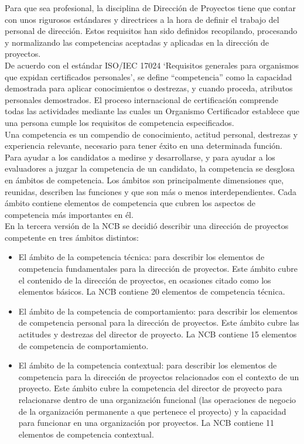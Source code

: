 Para que sea profesional, la disciplina de Dirección de Proyectos tiene que contar con unos rigurosos estándares y directrices a la hora de definir el trabajo del personal de dirección. Estos requisitos han sido definidos recopilando, procesando y normalizando las competencias aceptadas y aplicadas en la dirección de proyectos.\\

De acuerdo con el estándar ISO/IEC 17024 ‘Requisitos generales para organismos que expidan certificados personales', se define “competencia” como la capacidad demostrada para aplicar conocimientos o destrezas, y cuando proceda, atributos personales demostrados. El proceso internacional de certificación comprende todas las actividades mediante las cuales un Organismo Certificador establece que una persona cumple los requisitos de competencia especificados.\\

Una competencia es un compendio de conocimiento, actitud personal, destrezas y experiencia relevante, necesario para tener éxito en una determinada función. Para ayudar a los candidatos a medirse y desarrollarse, y para ayudar a los evaluadores a juzgar la competencia de un candidato, la competencia se desglosa en ámbitos de competencia. Los ámbitos son principalmente dimensiones que, reunidas, describen las funciones y que son más o menos interdependientes. Cada ámbito contiene elementos de competencia que cubren los aspectos de competencia más importantes en él.\\

En la tercera versión de la NCB se decidió describir una dirección de proyectos competente en tres ámbitos distintos:\\
\begin{itemize}
	\item El ámbito de la competencia técnica: para describir los elementos de competencia fundamentales para la dirección de proyectos. Este ámbito cubre el contenido de la dirección de proyectos, en ocasiones citado como los elementos básicos. La NCB contiene 20 elementos de competencia técnica.\\
	\item El ámbito de la competencia de comportamiento: para describir los elementos de competencia personal para la dirección de proyectos. Este ámbito cubre las actitudes y destrezas del director de proyecto. La NCB contiene 15 elementos de competencia de comportamiento.\\
	\item El ámbito de la competencia contextual: para describir los elementos de competencia para la dirección de proyectos relacionados con el contexto de un proyecto. Este ámbito cubre la competencia del director de proyecto para relacionarse dentro de una organización funcional (las operaciones de negocio de la organización permanente a que pertenece el proyecto) y la capacidad para funcionar en una organización por proyectos. La NCB contiene 11 elementos de competencia contextual.\\
\end{itemize}

